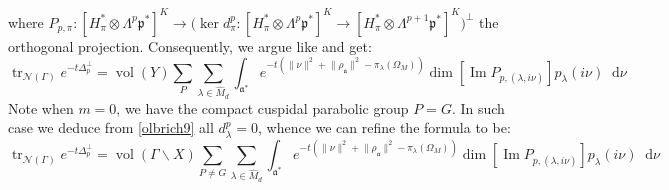 \documentclass[11pt]{report}
\theoremstyle{definition}
\theoremstyle{plain}
\DeclareMathOperator{\tr}{tr}
\DeclareMathOperator{\im}{Im}
\DeclareMathOperator{\vol}{vol}
\newcommand{\vna}{\mathcal{N}}
\renewcommand{\hat}{\widehat}
\newcommand{\norm}[1]{\lVert #1 \rVert}
\newcommand{\mass}[1]{\mathop{}\mathrm{d}{#1}}
\newcommand{\Lie}[1]{\mathfrak{#1}}
\begin{document}
where $P_{p, \pi}:[H_\pi^*\otimes \Lambda^{p}\Lie{p}^*]^K\to \big(\ker d^{p}_\pi:[H_\pi^*\otimes \Lambda^{p}\Lie{p}^*]^K\to [H_\pi^*\otimes \Lambda^{p+1}\Lie{p}^*]^K\big)^\perp$ the orthogonal projection. Consequently, we argue like  and get:
\begin{equation}
\tr_{\vna(\Gamma)}e^{-t\Delta_p^\perp}=\vol(Y)\sum_{P}\sum_{\lambda\in \hat{M}_d}\int_{\Lie{a}^*}^{}e^{-t(\norm{\nu}^2+\norm{\rho_{\Lie{a}}}^2-\pi_\lambda(\Omega_M))}\dim[\im P_{p, (\lambda, i\nu)}]p_{\lambda}(i\nu)\mass{\nu}
\end{equation}
Note when $m=0$, we have the compact cuspidal parabolic group $P=G$. In such case we deduce from \ref{olbrich9} all $d^p_{\lambda}=0$, whence we can refine the formula to be: 
\begin{equation}\label{olbrich11}
\tr_{\vna(\Gamma)}e^{-t\Delta_p^\perp}=\vol(\Gamma\backslash X)\sum_{P\neq G}\sum_{\lambda\in \hat{M}_d} \int_{\Lie{a}^*}^{}e^{-t(\norm{\nu}^2+\norm{\rho_{\Lie{a}}}^2-\pi_\lambda(\Omega_M))}\dim[\im P_{p, (\lambda, i\nu)}]p_{\lambda}(i\nu)\mass{\nu}
\end{equation}
\end{document}
